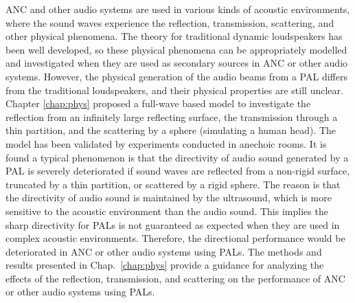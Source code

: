 {
ANC and other audio systems are used in various kinds of acoustic environments, where the sound waves experience the reflection, transmission, scattering, and other physical phenomena. 
The theory for traditional dynamic loudspeakers has been well developed, so these physical phenomena can be appropriately modelled and investigated when they are used as secondary sources in ANC or other audio systems.
However, the physical generation of the audio beams from a PAL differs from the traditional loudspeakers, and their physical properties are still unclear.
Chapter \ref{chap:phys} proposed a full-wave based model to investigate the reflection from an infinitely large reflecting surface, the transmission through a thin partition, and the scattering by a sphere (simulating a human head).
The model has been validated by experiments conducted in anechoic rooms.
It is found a typical phenomenon is that the directivity of audio sound generated by a PAL is severely deteriorated if sound waves are reflected from a non-rigid surface, truncated by a thin partition, or scattered by a rigid sphere. 
The reason is that the directivity of audio sound is maintained by the ultrasound, which is more sensitive to the acoustic environment than the audio sound.
This implies the sharp directivity for PALs is not guaranteed as expected when they are used in complex acoustic environments.
Therefore, the directional performance would be deteriorated in ANC or other audio systems using PALs.
The methods and results presented in Chap.~\ref{chap:phys} provide a guidance for analyzing the effects of the reflection, transmission, and scattering on the performance of ANC or other audio systems using PALs.
}


